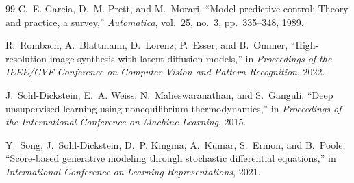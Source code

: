 \documentclass[11pt,a4paper]{article}
\theoremstyle{plain}
\theoremstyle{definition}
\theoremstyle{remark}
\begin{document}
\begin{thebibliography}{99}
C.~E. Garcia, D.~M. Prett, and M.~Morari, ``Model predictive control: Theory and practice, a survey,'' \textit{Automatica}, vol.~25, no.~3, pp.~335--348, 1989.

R.~Rombach, A.~Blattmann, D.~Lorenz, P.~Esser, and B.~Ommer, ``High-resolution image synthesis with latent diffusion models,'' in \textit{Proceedings of the IEEE/CVF Conference on Computer Vision and Pattern Recognition}, 2022.

J.~Sohl-Dickstein, E.~A. Weiss, N.~Maheswaranathan, and S.~Ganguli, ``Deep unsupervised learning using nonequilibrium thermodynamics,'' in \textit{Proceedings of the International Conference on Machine Learning}, 2015.

Y.~Song, J.~Sohl-Dickstein, D.~P. Kingma, A.~Kumar, S.~Ermon, and B.~Poole, ``Score-based generative modeling through stochastic differential equations,'' in \textit{International Conference on Learning Representations}, 2021.

\end{thebibliography}
\end{document}
